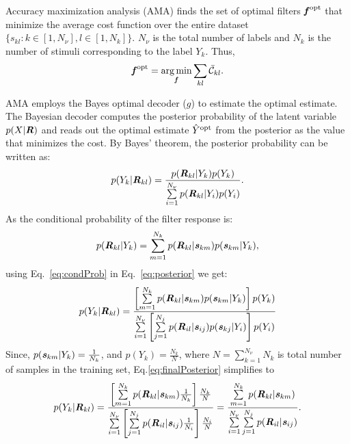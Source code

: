 \documentclass{jov}
\DeclareMathOperator*{\argmin}{arg\,min}
\begin{document}
Accuracy maximization analysis (AMA) finds the set of optimal filters ${\textbf{\textit f}}^{\rm opt}$ that minimize the average cost function over the entire dataset $\{s_{kl}: k\in[1,N_{\nu}], l\in[1,N_k]\}$. $N_{\nu}$ is the total number of labels and $N_{k}$ is the number of stimuli corresponding to the label $Y_k$. Thus,
\begin{align}
{\textbf {\textit f} }^{\rm opt} = \argmin_{\textbf {\textit f} } \sum_{kl} \bar{\mathcal{C}}_{kl}.
\label{eq:fopt}
\end{align}

AMA employs the Bayes optimal decoder ($g$) to estimate the optimal estimate. The Bayesian decoder computes the posterior probability of the latent variable $p(X|{\textbf {\textit R}})$ and reads out the optimal estimate $\hat{Y}^{\rm opt}$ from the posterior as the value that minimizes the cost. By Bayes' theorem, the posterior probability can be written as:
\begin{align}
p(Y_k|{\textbf {\textit R} }_{kl}) = \frac{p({\textbf {\textit R} }_{kl}|Y_k)p(Y_k)}{\sum\limits_{i=1}^{N_{\nu}}{p({\textbf {\textit R} }_{kl}|Y_i)p(Y_i)}}.
\label{eq:posterior}
\end{align}
As the conditional probability of the filter response is:
\begin{align}
p({\textbf {\textit R} }_{kl}|Y_k) = \sum\limits_{m=1}^{N_k}p({\textbf {\textit R} }_{kl}|{\textbf {\textit s} }_{km})p({\textbf {\textit s} }_{km}|Y_k),
\label{eq:condProb}
\end{align}
using Eq.~\ref{eq:condProb} in Eq.~\ref{eq:posterior} we get:
\begin{align}
p(Y_k|{\textbf {\textit R} }_{kl}) = \frac{\left[\sum\limits_{m=1}^{N_k}p({\textbf {\textit R} }_{kl}|{\textbf {\textit s} }_{km})p({\textbf {\textit s} }_{km}|Y_k)\right]p(Y_k)}{\sum\limits_{i=1}^{N_{\nu}}{\left[\sum\limits_{j=1}^{N_j}p({\textbf {\textit R} }_{il}|{\textbf {\textit s} }_{ij})p({\textbf {\textit s} }_{kj}|Y_i)\right]p(Y_i)}}
\label{eq:finalPosterior}
\end{align}
Since, $p({\textbf {\textit s} }_{km}|Y_k) = \frac{1}{N_k}$, and $p(Y_k)=\frac{N_k}{N}$, where $N = \sum\limits_{k=1}^{N_{\nu}}N_{k}$ is total number of samples in the training set, Eq.\ref{eq:finalPosterior} simplifies to
\begin{align}
p(Y_k|{\textbf {\textit R} }_{kl}) = \frac{\left[\sum\limits_{m=1}^{N_k}p({\textbf {\textit R} }_{kl}|{\textbf {\textit s} }_{km}) \frac{1}{N_k}\right]\frac{N_k}{N}}{\sum\limits_{i=1}^{N_{\nu}}{\left[\sum\limits_{j=1}^{N_j}p({\textbf {\textit R} }_{il}|{\textbf {\textit s} }_{ij}) \frac{1}{N_i}\right]\frac{N_i}{N}}} = \frac{\sum\limits_{m=1}^{N_k}p({\textbf {\textit R} }_{kl}|{\textbf {\textit s} }_{km})}{\sum\limits_{i=1}^{N_{\nu}}{\sum\limits_{j=1}^{N_j}p({\textbf {\textit R} }_{il}|{\textbf {\textit s} }_{ij})}}.
\label{eq:simplifiedPosterior}
\end{align}
\end{document}
